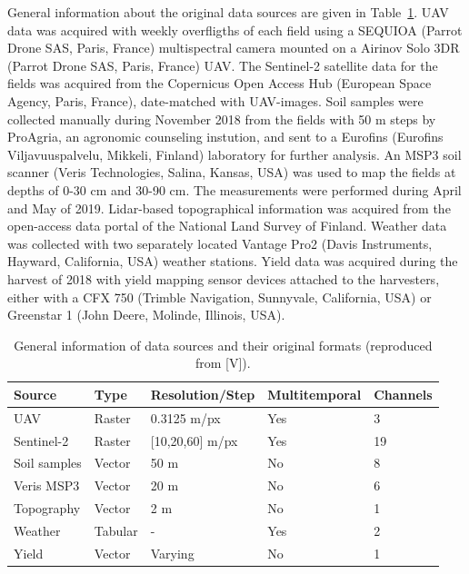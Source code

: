 General information about the original data sources are given in Table~\ref{tab:v-data-general}. UAV data was acquired with weekly overfligths of each field using a SEQUIOA (Parrot Drone SAS, Paris, France) multispectral camera mounted on a Airinov Solo 3DR (Parrot Drone SAS, Paris, France) UAV. The Sentinel-2 satellite data for the fields was acquired from the Copernicus Open Access Hub (European Space Agency, Paris, France), date-matched with UAV-images. Soil samples were collected manually during November 2018 from the fields with 50 m steps by ProAgria, an agronomic counseling instution, and sent to a Eurofins (Eurofins Viljavuuspalvelu, Mikkeli, Finland) laboratory for further analysis. An MSP3 soil scanner (Veris Technologies, Salina, Kansas, USA) was used to map the fields at depths of 0-30 cm and 30-90 cm. The measurements were performed during April and May of 2019. Lidar-based topographical information was acquired from the open-access data portal of the National Land Survey of Finland. Weather data was collected with two separately located Vantage Pro2 (Davis Instruments, Hayward, California, USA) weather stations. Yield data was acquired during the harvest of 2018 with yield mapping sensor devices attached to the harvesters, either with a CFX 750 (Trimble Navigation, Sunnyvale, California, USA) or Greenstar 1 (John Deere, Molinde, Illinois, USA). 

\begin{table}[htb]
    \centering
    \scriptsize
    \caption{General information of data sources and their original formats (reproduced from [V]).}
    \label{tab:v-data-general}
    \begin{tabular}{@{}lllll@{}}
    \toprule
    \textbf{Source} & \textbf{Type} & \textbf{Resolution/Step} & \textbf{Multitemporal} & \textbf{Channels} \\ \midrule
    UAV             & Raster        & 0.3125 m/px              & Yes                    & 3                 \\
    Sentinel-2     & Raster        & {[}10,20,60{]} m/px      & Yes                    & 19                \\
    Soil samples    & Vector        & 50 m                     & No                     & 8                 \\
    Veris MSP3      & Vector        & 20 m                     & No                     & 6                 \\
    Topography      & Vector        & 2 m                      & No                     & 1                 \\
    Weather         & Tabular       & -                        & Yes                    & 2                 \\
    Yield           & Vector        & Varying                  & No                     & 1                 \\ \bottomrule
    \end{tabular}
\end{table}

